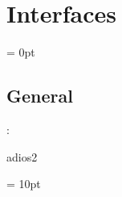 
\section{Interfaces} 


\parskip = 0pt

\vspace{3mm} \subsection*{General}

: 

adios2
\vspace{2mm}

\vspace{5mm}\parskip = 10pt 
